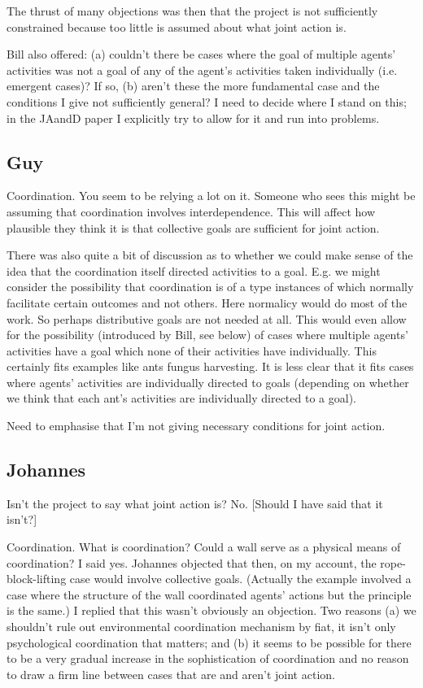 \documentclass[12pt,a4paper]{extarticle}
\begin{document}
The thrust of many objections was then that the project is not sufficiently constrained because too little is assumed about what joint action is.

Bill also offered: (a) couldn't there be cases where the goal of multiple agents' activities was not a goal of any of the agent's activities taken individually (i.e. emergent cases)?  If so, (b) aren't these the more fundamental case and the conditions I give not sufficiently general?
I need to decide where I stand on this; in the JAandD paper I explicitly try to allow for it and run into problems.


\subsection{Guy}
Coordination.
You seem to be relying a lot on it.
Someone who sees this might be assuming that coordination involves interdependence.
This will affect how plausible they think it is that collective goals are sufficient for joint action.

There was also quite a bit of discussion as to whether we could make sense of the idea that the coordination itself directed activities to a goal.  
E.g. we might consider the possibility that coordination is of a type instances of which normally facilitate certain outcomes and not others.
Here normalicy would do most of the work.  So perhaps distributive goals are not needed at all.
This would even allow for the possibility (introduced by Bill, see below) of cases where multiple agents' activities have a goal which none of their activities have individually.
This certainly fits examples like ants fungus harvesting.
It is less clear that it fits cases where agents' activities are individually directed to goals (depending on whether we think that each ant's activities are individually directed to a goal).

Need to emphasise that I'm not giving necessary conditions for  joint action.


\subsection{Johannes}
Isn't the project to say what joint action is?  No.  [Should I have said that it isn't?]

Coordination.
What is coordination?
Could a wall serve as a physical means of coordination?  
I said yes.
Johannes objected that then, on my account, the rope-block-lifting case would involve collective goals.  (Actually the example involved a case where  the structure of the wall coordinated agents' actions but the principle is the same.)
I replied that this wasn't obviously an objection.
Two reasons (a) we shouldn't rule out environmental coordination mechanism by fiat, it isn't only psychological coordination that matters; and (b) it seems to be possible for there to be a very gradual increase in the sophistication of coordination and no reason to draw a firm line between cases that are and aren't joint action.
\end{document}
